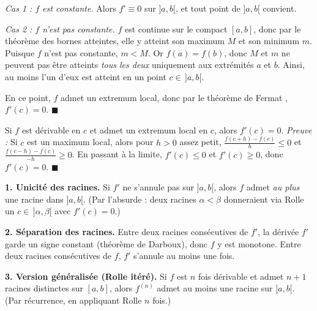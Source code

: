 \begin{mdframed}[style=proofbar]
  \textit{Cas 1 : $f$ est constante.}\enspace%
  Alors $f' \equiv 0$ sur $]a,b[$, et tout point de $]a,b[$ convient.

  \medskip
  \textit{Cas 2 : $f$ n'est pas constante.}\enspace%
  $f$ est continue sur le compact $[a,b]$, donc par le théorème des bornes
  atteintes, elle y atteint son maximum $M$
  et son minimum $m$. Puisque $f$ n'est pas constante, $m < M$.
  Or $f(a) = f(b)$, donc $M$ et $m$ ne peuvent pas être atteints \emph{tous les deux}
  uniquement aux extrémités $a$ et $b$. Ainsi, au moins l'un d'eux est atteint en
  un point $c \in\, ]a,b[$.

  En ce point, $f$ admet un extremum local, donc par le théorème de Fermat
  , $f'(c) = 0$. \hfill$\blacksquare$
\end{mdframed}


\begin{mdframed}[style=proofbar]
  Si $f$ est dérivable en $c$ et admet un extremum local en $c$, alors $f'(c)=0$.
  \textit{Preuve :} Si $c$ est un maximum local, alors pour $h>0$ assez petit,
  $\frac{f(c+h)-f(c)}{h}\leq 0$ et $\frac{f(c-h)-f(c)}{-h}\geq 0$.
  En passant à la limite, $f'(c)\leq 0$ et $f'(c)\geq 0$, donc $f'(c)=0$. \hfill$\blacksquare$
\end{mdframed}

\decsep{}



\begin{mdframed}[style=exbar]
  \textbf{1. Unicité des racines.}\enspace%
  Si $f'$ ne s'annule pas sur $]a,b[$, alors $f$ admet \emph{au plus} une racine dans
  $]a,b[$. (Par l'absurde : deux racines $\alpha < \beta$ donneraient via Rolle
  un $c \in\,]\alpha,\beta[$ avec $f'(c)=0$.)

  \smallskip\noindent
  \textbf{2. Séparation des racines.}\enspace%
  Entre deux racines consécutives de $f'$, la dérivée $f'$ garde un signe
  constant (théorème de Darboux), donc $f$ y est monotone.
  Entre deux racines consécutives de $f$, $f'$ s'annule au moins une fois.

  \smallskip\noindent
  \textbf{3. Version généralisée (Rolle itéré).}\enspace%
  Si $f$ est $n$ fois dérivable et admet $n+1$ racines distinctes sur $[a,b]$,
  alors $f^{(n)}$ admet au moins une racine sur $]a,b[$.
  (Par récurrence, en appliquant Rolle $n$ fois.)
\end{mdframed}

